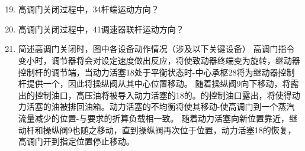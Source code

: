 \documentclass{book}
\begin{document}
\section{}
\begin{enumerate}
	\setcounter{enumi}{18}
	\item 高调门关闭过程中，34杆端运动方向？
	\item 高调门关闭过程中，41调速器联杆运动方向？
	\item 简述高调门关闭时，图中各设备动作情况（涉及以下关键设备）
高调门指令变小时，调节器将会对设定速度做出反应，将使致动器终端变为旋转，继动器控制杆的调节端，当动力活塞18处于平衡状态时-中心承枢28将为继动器控制杆提供一个，因此将操纵阀从其中心位置移动。
随着操纵阀9{向下}移动，将露出的控制油口，高压油将被导入动力活塞的18的。的控制油口露出，将使得动力活塞的油被排回油箱。动力活塞的不均衡将使其移动-使高调门到一个蒸汽流量减少的位置-与要求的折算负载相一致。
随着动力活塞向新位置靠近，继动杆和操纵阀9也随之移动，直到操纵阀再次位于位置，动力活塞18的恢复，高调门开到指定位置停止移动。
\end{enumerate}
\end{document}
